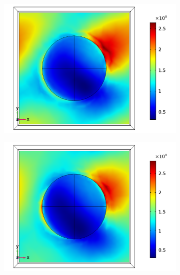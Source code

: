 \begin{figure}[htb!]
    \begin{subfigure}{0.32\textwidth}    %
        \centering
        \includegraphics[width=\linewidth]{figures/ch4/S5A/FieldDistribution/phi25/Sample5A_TM_Slice@z=0_wl=230_phi=25.png}
   \end{subfigure}
   \begin{subfigure}{0.32\textwidth}
        \centering
        \includegraphics[width=\linewidth]{figures/ch4/S5A/FieldDistribution/phi25/Sample5A_TM_Slice@z=0_wl=255_phi=25.png}
   \end{subfigure}
   \begin{subfigure}{0.32\textwidth}
        \centering

\end{subfigure}
\end{figure}
